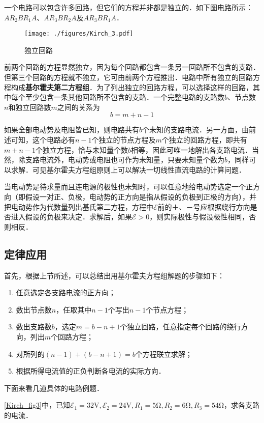 一个电路可以包含许多回路，但它们的方程并非都是独立的．如下图电路所示：$AR_2BR_1A$、$AR_3BR_2A$及$AR_3BR_1A$．
\begin{figure}[ht]
\centering
\texttt{[image: ./figures/Kirch\_3.pdf]}
\caption{独立回路} \label{Kirch_fig3}
\end{figure}

前两个回路的方程显然独立，因为每个回路都包含一条另一回路所不包含的支路．但第三个回路的方程就不独立，它可由前两个方程推出．电路中所有独立的回路方程构成\textbf{基尔霍夫第二方程组}．为了列出独立的回路方程，可以选择这样的回路，其中每个至少包含一条其他回路所不包含的支路．一个完整电路的支路数$b$、节点数$n $和独立回路数$m $之间的关系为
\begin{equation}
b=m+n-1
\end{equation}

如果全部电动势及电阻皆已知，则电路共有$b $个未知的支路电流．另一方面，由前述可知，这个电路必有$n-1 $个独立的节点方程及$m $个独立的回路方程，即共有$m + n -1$个独立方程，恰与未知量个数$b $相等，因此可唯一地解出各支路电流．当然，除支路电流外，电动势或电阻也可作为未知量，只要未知量个数为$b$，同样可以求解．可见基尔霍夫方程组原则上可以解决一切线性直流电路的计算问题．

当电动势是待求量而且连电源的极性也未知时，可以任意地给电动势选定一个正方向（即假设一对正、负极，电动势的正方向是指从假设的负极到正极的方向），并把电动势作为代数量列出基氏第二方程，方程中$\mathscr E$前的$＋$、$－$号应根据绕行方向是否进入假设的负极来决定．求解后，如果$\mathscr E>0$，则实际极性与假设极性相同，否则相反． 

\subsection{定律应用}

首先，根据上节所述，可以总结出用基尔霍夫方程组解题的步骤如下：
\begin{enumerate}
\item 任意选定各支路电流的正方向；
\item 数出节点数$n$，任取其中$n-1 $个写出$n - 1 $个节点方程；
\item 数出支路数$b$，选定$m=b-n+1 $个独立回路，任意指定每个回路的绕行方向，列出$m $个回路方程；
\item 对所列的$(n-1)+(b-n+1)=b $个方程联立求解；
\item 根据所得电流值的正负判断各电流的实际方向．
\end{enumerate}

下面来看几道具体的电路例题．

\begin{example}{}
\autoref{Kirch_fig3}中，已知$\mathscr{E}_{1}=32 \mathrm{V}, \mathscr{E}_{2}=24 \mathrm{V}, R_{1}=5 \mathrm{\Omega}, R_{2}=6 \mathrm{\Omega}, R_{3}=54 \mathrm{Ω}$，求各支路的电流．
\end{example}